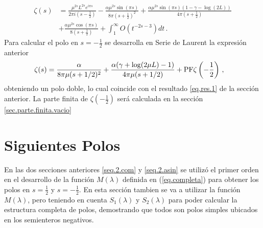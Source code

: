 \begin{equation}\label{eq.laurent}
\begin{aligned}
    \zeta  (s)  & = 
     \frac{\mu ^{2s} L ^{2 s} e ^{i \pi s}}{2 \pi i (s-\frac{1}{2})}  
    -\frac{\alpha \mu ^{2s} \sin(\pi s)}{8 \pi \left( s+\frac{1}{2} \right) ^2}  + 
    \frac{\alpha \mu ^{2s} \sin  (\pi s) (1 - \gamma -   \log (2 L))}{4 \pi (s+ \frac{1}{2} )} 
\\
    & + \frac{\alpha \mu ^{2s} \cos(\pi s)}{8 (s+\frac{1}{2} )} +
    \int _1 ^{\infty} O \left( t ^{-2s-3} \right) dt
    	\, .
\end{aligned}
\end{equation}
Para calcular el polo en $s=- \frac{1}{2}$ se desarrolla en Serie de Laurent la expresión anterior
\begin{align}
\label{eq.result.zeta.c}
    &\zeta  (s) =  \frac{\alpha}{8  \pi \mu (s+1/2)^2} +
    \frac{ \alpha ( \gamma  +  \log (2\mu L ) -1 ) }{4  \pi \mu (s+1/2) }  + 
	{\rm PF } \zeta \left( - \frac{1}{2} \right)
    	\, ,
\end{align}
obteniendo un polo doble, lo cual coincide con el resultado \eqref{eq.res.1} de la sección anterior.
La parte finita de $ \zeta \left( - \frac{1}{2} \right)$ será calculada en la sección \ref{sec.parte.finita.vacio}

\section{Siguientes Polos}\label{sec.sig.polos}


En las dos secciones anteriores \ref{seq.2.com} y \ref{seq.2.asin} se utilizó el primer orden en el desarrollo de la función $ M (\lambda )$ definida en (\ref{eq.completa}) para obtener los polos en $s= \frac{1}{2}$ y $s=- \frac{1}{2}$. En esta sección tambien se va a utilizar la función $M ( \lambda )$, pero teniendo en cuenta $S _1 ( \lambda ) $ y $S _2 ( \lambda )$ para poder calcular la estructura completa de polos, demostrando que todos son polos simples ubicados en los semienteros negativos. 


